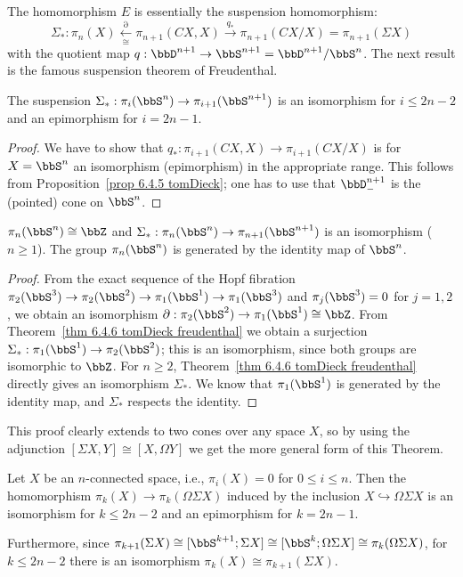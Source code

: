 The homomorphism $E$ is essentially the suspension homomorphism:
\[\Sigma_\ast: \pi_n(X)\underset{\cong}{\overset{\partial}{\leftarrow}}\pi_{n+1}(CX,X)\overset{q_\ast}{\to}\pi_{n+1}(CX\slash X)=\pi_{n+1}(\Sigma X)\]
with the quotient map $q:\bbD^{n+1}\to \bbS^{n+1}=\bbD^{n+1}\slash \bbS^n$. The next result is the famous suspension theorem of Freudenthal.

\begin{thm}\label{thm 6.4.6 tomDieck freudenthal}
    The suspension $\Sigma_\ast:\pi_i(\bbS^n)\to \pi_{i+1}(\bbS^{n+1})$ is an isomorphism for $i\leq 2n-2$ and an epimorphism for $i=2n-1$.
\end{thm}
\begin{proof}
    We have to show that $q_\ast:\pi_{i+1}(CX,X)\to \pi_{i+1}(CX\slash X)$ is for $X=\bbS^n$ an isomorphism (epimorphism) in the appropriate range. This follows from Proposition~\ref{prop 6.4.5 tomDieck}; one has to use that  $\bbD^{n+1}_-$ is the (pointed) cone on $\bbS^n$.
\end{proof}

\begin{thm}\label{thm 6.4.7 tomDieck freudenthal}
    $\pi_n(\bbS^n)\cong \bbZ$ and $\Sigma_\ast:\pi_n(\bbS^n)\to \pi_{n+1}(\bbS^{n+1})$ is an isomorphism ($n\geq 1$). The group $\pi_n(\bbS^n)$ is generated by the identity map of $\bbS^n$.
\end{thm}
\begin{proof}
    From the exact sequence of the Hopf fibration $\pi_2(\bbS^3)\to \pi_2(\bbS^2)\to \pi_1(\bbS^1)\to \pi_1(\bbS^3)$ and $\pi_j(\bbS^3)=0$ for $j=1,2$, we obtain an isomorphism $\partial:\pi_2(\bbS^2)\to \pi_1(\bbS^1)\cong \bbZ$. From Theorem~\ref{thm 6.4.6 tomDieck freudenthal} we obtain a surjection $\Sigma_\ast:\pi_1(\bbS^1)\to \pi_2(\bbS^2)$; this is an isomorphism, since both groups are isomorphic to $\bbZ$. For $n\geq 2$, Theorem~\ref{thm 6.4.6 tomDieck freudenthal} directly gives an isomorphism $\Sigma_\ast$. We know that $\pi_1(\bbS^1)$ is generated by the identity map, and $\Sigma_\ast$ respects the identity.
\end{proof}

This proof clearly extends to two cones over any space $X$, so by using the adjunction $[\Sigma X,Y]\cong[X,\Omega Y]$ we get the more general form of this Theorem.

\begin{thm}
Let $X$ be an $n$-connected space, i.e., $\pi_i(X)=0$ for $0\leq i\leq n$. Then the homomorphism $\pi_k(X)\to \pi_k(\Omega \Sigma X)$ induced by the inclusion $X\hookrightarrow \Omega\Sigma X$ is an isomorphism for $k\leq 2n-2$ and an epimorphism for $k=2n-1$.

Furthermore, since $\pi_{k+1}(\Sigma X)\cong[\bbS^{k+1};\Sigma X]\cong[\bbS^k;\Omega \Sigma X]\cong\pi_k(\Omega \Sigma X)$, for $k\leq 2n-2$ there is an isomorphism $\pi_k(X)\cong \pi_{k+1}(\Sigma X)$.
\end{thm}

